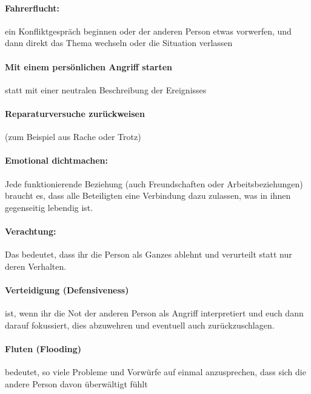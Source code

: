 \paragraph{Fahrerflucht:} ein Konfliktgespräch beginnen oder der anderen Person etwas vorwerfen, und dann direkt das Thema wechseln oder die Situation verlassen

\paragraph{Mit einem persönlichen Angriff starten} statt mit einer neutralen Beschreibung der Ereignisses

\paragraph{Reparaturversuche zurückweisen} (zum Beispiel aus Rache oder Trotz)

\paragraph{Emotional dichtmachen:} Jede funktionierende Beziehung (auch Freundschaften oder Arbeitsbeziehungen) braucht es, dass alle Beteiligten eine Verbindung dazu zulassen, was in ihnen gegenseitig lebendig ist.

\paragraph{Verachtung:} Das bedeutet, dass ihr die Person als Ganzes ablehnt und verurteilt statt nur deren Verhalten.

\paragraph{Verteidigung (Defensiveness)} ist, wenn ihr die Not der anderen Person als Angriff interpretiert und euch dann darauf fokussiert, dies abzuwehren und eventuell auch zurückzuschlagen.

\paragraph{Fluten (Flooding)} bedeutet, so viele Probleme und Vorwürfe auf einmal anzusprechen, dass sich die andere Person davon überwältigt fühlt

